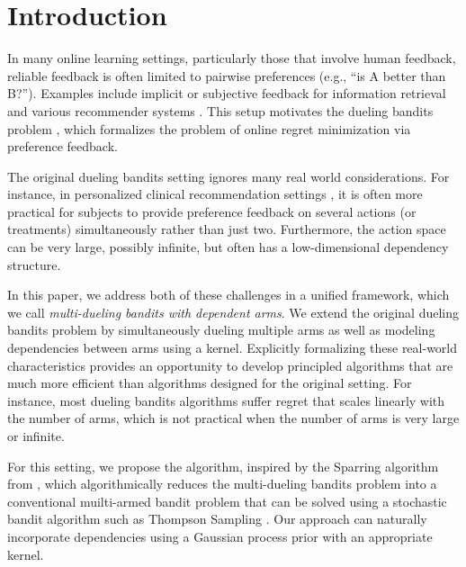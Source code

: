 \section{Introduction}

In many online learning settings, particularly those that involve human feedback, reliable feedback is often limited to pairwise preferences (e.g., ``is A better than B?''). Examples include implicit or subjective feedback for information retrieval and various recommender systems  \citep{chapelle2012large,sui2014clinical}.  This setup motivates the dueling bandits problem \citep{yue2012k}, which formalizes the problem of online regret minimization via preference feedback.

The original dueling bandits setting ignores many real world considerations. For instance, in personalized clinical recommendation settings \citep{sui2014clinical}, it is often more practical for subjects to provide preference feedback on several actions (or treatments) simultaneously rather than just two.  Furthermore, the action space can be very large, possibly infinite, but often has a low-dimensional dependency structure.

In this paper, we address both of these challenges in a unified framework, which we call \textit{multi-dueling bandits with dependent arms}.  We extend the original dueling bandits problem by simultaneously dueling multiple arms as well as modeling dependencies between arms using a kernel.  Explicitly formalizing these real-world characteristics provides an opportunity to develop principled algorithms that are much more efficient than algorithms designed for the original setting.  For instance, most dueling bandits algorithms suffer regret that scales linearly with the number of arms, which is not practical when the number of arms is very large or infinite.  

For this setting, we propose the \selfsparring algorithm, inspired by the Sparring algorithm from \cite{ailon2014reducing}, which algorithmically reduces the multi-dueling bandits problem into a conventional muilti-armed bandit problem that can be solved using a stochastic bandit algorithm such as Thompson Sampling \citep{chapelle2011empirical,russo2014learning}. Our approach can naturally incorporate dependencies using a Gaussian process prior with an appropriate kernel.

